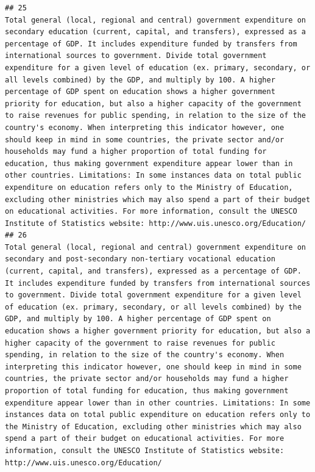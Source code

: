 \documentclass[
]{article}
\begin{document}
\begin{verbatim}
## 25                                                                                                                                                                                           Total general (local, regional and central) government expenditure on secondary education (current, capital, and transfers), expressed as a percentage of GDP. It includes expenditure funded by transfers from international sources to government. Divide total government expenditure for a given level of education (ex. primary, secondary, or all levels combined) by the GDP, and multiply by 100. A higher percentage of GDP spent on education shows a higher government priority for education, but also a higher capacity of the government to raise revenues for public spending, in relation to the size of the country's economy. When interpreting this indicator however, one should keep in mind in some countries, the private sector and/or households may fund a higher proportion of total funding for education, thus making government expenditure appear lower than in other countries. Limitations: In some instances data on total public expenditure on education refers only to the Ministry of Education, excluding other ministries which may also spend a part of their budget on educational activities. For more information, consult the UNESCO Institute of Statistics website: http://www.uis.unesco.org/Education/
## 26                                                                                                                                                Total general (local, regional and central) government expenditure on secondary and post-secondary non-tertiary vocational education (current, capital, and transfers), expressed as a percentage of GDP. It includes expenditure funded by transfers from international sources to government. Divide total government expenditure for a given level of education (ex. primary, secondary, or all levels combined) by the GDP, and multiply by 100. A higher percentage of GDP spent on education shows a higher government priority for education, but also a higher capacity of the government to raise revenues for public spending, in relation to the size of the country's economy. When interpreting this indicator however, one should keep in mind in some countries, the private sector and/or households may fund a higher proportion of total funding for education, thus making government expenditure appear lower than in other countries. Limitations: In some instances data on total public expenditure on education refers only to the Ministry of Education, excluding other ministries which may also spend a part of their budget on educational activities. For more information, consult the UNESCO Institute of Statistics website: http://www.uis.unesco.org/Education/

\end{verbatim}
\end{document}
